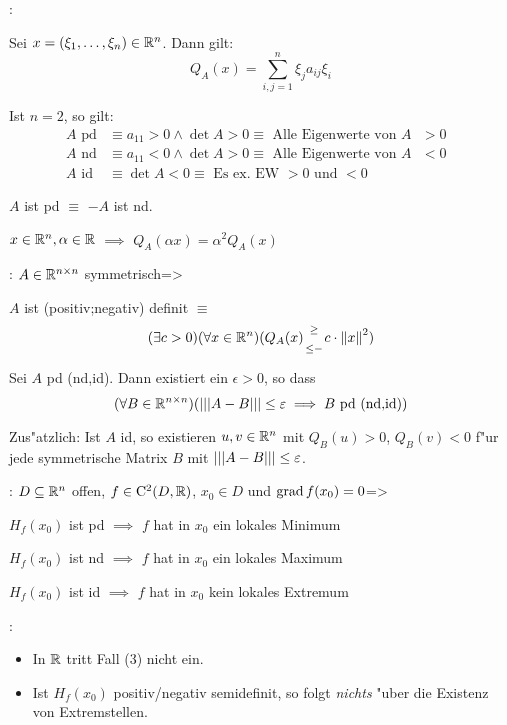 \remark:{
  \begin{stmts}
    \item Sei $x=(\xi_1,\ldots,\xi_n)\in\mathbb R^n$. Dann gilt:
      \[Q_A(x)=\sum_{i,j=1}^n \xi_j a_{ij} \xi_i
        \]
    \item Ist $n=2$, so gilt:
      \begin{align*}
        A \text{ pd} & \equiv a_{11}>0 \land \det A>0 \equiv \text{ Alle Eigenwerte von $A$ $>0$ } \\
        A \text{ nd} & \equiv a_{11}<0 \land \det A>0 \equiv \text{ Alle Eigenwerte von $A$ $<0$ } \\
        A \text{ id} & \equiv \det A<0 \equiv \text{ Es ex. EW $>0$ und $<0$ }
        \end{align*}
    \item $A$ ist pd $\equiv$ $-A$ ist nd.
    \item $x\in\mathbb R^n,\alpha\in\mathbb R$ $\implies$ $Q_A(\alpha x)=\alpha^2Q_A(x)$
    \end{stmts}
  }
\theorem:
  $A\in\mathbb R^{n\times n}$ symmetrisch=>{
  \begin{stmts}
    \item $A$ ist \tstack(positiv;negativ) definit $\equiv$
      \[(\exists c>0)(\forall x\in\SetR^n)(Q_A(x)\stack(\geq;\leq -) c\cdot \norm x^2)
        \]
    \item Sei $A$ pd (nd,id). Dann existiert ein $\epsilon>0$, so dass
      \[(\forall B\in\mathbb R^{n\times n})({\left|\left|\left|A-B\right|\right|\right|}\leq\varepsilon \implies 
        B \text{ pd (nd,id)})
        \]
      
      Zus"atzlich: Ist $A$ id, so existieren $u,v\in\mathbb R^n$ mit 
      $Q_B(u)>0$, $Q_B(v)<0$ f"ur jede symmetrische Matrix $B$ mit
      ${\left|\left|\left|A-B\right|\right|\right|}\leq\varepsilon$.
    \end{stmts}
  }
\theorem:
  $D\subseteq\mathbb R^n$ offen, $f\in{\rm C}^2(D,\mathbb R)$, $x_0\in D$ und
  $\operatorname{grad} f(x_0)=0$=>{
  \begin{stmts}
    \item $H_f(x_0)$ ist pd $\implies$ $f$ hat in $x_0$ ein lokales Minimum
    \item $H_f(x_0)$ ist nd $\implies$ $f$ hat in $x_0$ ein lokales Maximum
    \item $H_f(x_0)$ ist id $\implies$ $f$ hat in $x_0$ kein lokales Extremum
    \end{stmts}
  }
\remark:{
  \begin{itemize}
    \item In $\mathbb R$ tritt Fall (3) nicht ein.
    \item Ist $H_f(x_0)$ positiv/negativ semidefinit, so folgt \textit{nichts}
      "uber die Existenz von Extremstellen.
    \end{itemize}
  }
